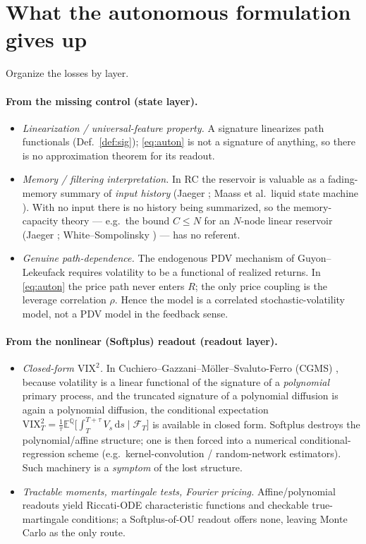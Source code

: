 \documentclass[11pt]{article}
\theoremstyle{definition}
\theoremstyle{plain}
\newcommand{\E}{\mathbb{E}}
\newcommand{\Q}{\mathbb{Q}}
\newcommand{\F}{\mathcal{F}}
\newcommand{\dd}{\,\mathrm{d}}
\begin{document}
\section{What the autonomous formulation gives up}
\label{sec:losses}

Organize the losses by layer.

\paragraph{From the missing control (state layer).}
\begin{itemize}
\item \emph{Linearization / universal-feature property.} A signature linearizes path functionals (Def.~\ref{def:sig}); \eqref{eq:auton} is not a signature of anything, so there is no approximation theorem for its readout.
\item \emph{Memory / filtering interpretation.} In RC the reservoir is valuable as a fading-memory summary of \emph{input history} (Jaeger \cite{jaeger2001}; Maass et al.\ liquid state machine \cite{maass2002}). With no input there is no history being summarized, so the memory-capacity theory --- e.g.\ the bound $C\le N$ for an $N$-node linear reservoir (Jaeger \cite{jaeger2002stm}; White--Sompolinsky \cite{white2004}) --- has no referent.
\item \emph{Genuine path-dependence.} The endogenous PDV mechanism of Guyon--Lekeufack \cite{guyon2023} requires volatility to be a functional of realized returns. In \eqref{eq:auton} the price path never enters $R$; the only price coupling is the leverage correlation $\rho$. Hence the model is a correlated stochastic-volatility model, not a PDV model in the feedback sense.
\end{itemize}

\paragraph{From the nonlinear (Softplus) readout (readout layer).}
\begin{itemize}
\item \emph{Closed-form $\mathrm{VIX}^2$.} In Cuchiero--Gazzani--M\"oller--Svaluto-Ferro (CGMS) \cite{cgms2025}, because volatility is a linear functional of the signature of a \emph{polynomial} primary process, and the truncated signature of a polynomial diffusion is again a polynomial diffusion, the conditional expectation $\mathrm{VIX}^2_T=\tfrac1\tau\E^\Q\!\big[\int_T^{T+\tau}V_s\dd s\mid\F_T\big]$ is available in closed form. Softplus destroys the polynomial/affine structure; one is then forced into a numerical conditional-regression scheme (e.g.\ kernel-convolution / random-network estimators). Such machinery is a \emph{symptom} of the lost structure.
\item \emph{Tractable moments, martingale tests, Fourier pricing.} Affine/polynomial readouts yield Riccati-ODE characteristic functions and checkable true-martingale conditions; a Softplus-of-OU readout offers none, leaving Monte Carlo as the only route.
\end{itemize}
\end{document}
